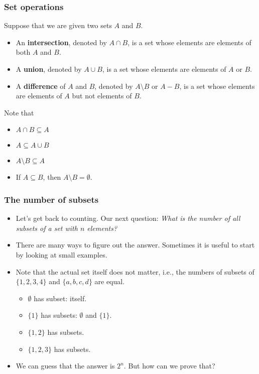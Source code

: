 \begin{frame}\frametitle{Set operations}
  Suppose that we are given two sets $A$ and $B$.
  \begin{itemize}
  \item An {\bf intersection}, denoted by $A\cap B$, is a set whose
    elements are elements of both $A$ and $B$.
  \item A {\bf union}, denoted by $A\cup B$, is a set whose elements
    are elements of $A$ or $B$.
  \item A {\bf difference} of $A$ and $B$, denoted by $A\setminus B$
    or $A-B$, is a set whose elements are elements of $A$ but not
    elements of $B$.
  \end{itemize}

  Note that
  \begin{itemize}
  \item $A\cap B\subseteq A$
  \item $A\subseteq A\cup B$
  \item $A\setminus B \subseteq A$
  \item If $A\subseteq B$, then $A\setminus B = \emptyset$.
  \end{itemize}
\end{frame}

\begin{frame}\frametitle{The number of subsets}
  \begin{itemize}
  \item Let's get back to counting.  Our next question: {\em What is the
    number of all subsets of a set with $n$ elements?}
    \pause
  \item There are many ways to figure out the answer.  Sometimes it is
    useful to start by looking at small examples.
    \pause
  \item Note that the actual set itself does not matter, i.e., the
    numbers of subsets of $\{1,2,3,4\}$ and $\{a,b,c,d\}$ are equal.
    \begin{itemize}
    \item $\emptyset$ has  subset: itself.
    \item $\{1\}$ has  subsets: $\emptyset$ and $\{1\}$.
    \item $\{1,2\}$ has  subsets.
    \item $\{1,2,3\}$ has  subsets.
    \end{itemize}
    \pause
  \item We can guess that the answer is $2^n$.  But how can we prove
    that?
  \end{itemize}
\end{frame}

